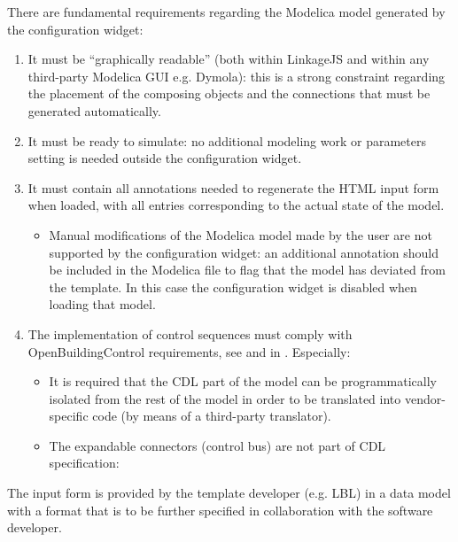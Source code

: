 \documentclass[letterpaper,10pt, openany,english]{sphinxmanual}
\begin{document}
There are fundamental requirements regarding the Modelica model generated by the configuration widget:
\begin{enumerate}
%
\item {} 
It must be “graphically readable” (both within LinkageJS and within any third-party Modelica GUI e.g. Dymola): this is a strong constraint regarding the placement of the composing objects and the connections that must be generated automatically.

\item {} 
It must be ready to simulate: no additional modeling work or parameters setting is needed outside the configuration widget.

\item {} 
It must contain all annotations needed to regenerate the HTML input form when loaded, with all entries corresponding to the actual state of the model.
\begin{itemize}
\item {} 
Manual modifications of the Modelica model made by the user are not supported by the configuration widget: an additional annotation should be included in the Modelica file to flag that the model has deviated from the template. In this case the configuration widget is disabled when loading that model.

\end{itemize}

\item {} 
The implementation of control sequences must comply with OpenBuildingControl requirements, see  and  in . Especially:
\begin{itemize}
\item {} 
It is required that the CDL part of the model can be programmatically isolated from the rest of the model in order to be translated into vendor-specific code (by means of a third-party translator).

\item {} 
The expandable connectors (control bus) are not part of CDL specification: 

\end{itemize}

\end{enumerate}

The input form is provided by the template developer (e.g. LBL) in a data model with a format that is to be further specified in collaboration with the software developer.
\end{document}
